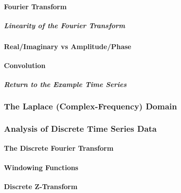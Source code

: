 \documentclass[american, twoside]{article}
\begin{document}
\paragraph{Fourier Transform} \label{Background:Math:Spectral:FourTransform}
\subparagraph{Linearity of the Fourier Transform} \label{Background:Math:Spectral:FourTransform:Linearity}
\paragraph{Real/Imaginary vs Amplitude/Phase} \label{Background:Math:Spectral:AmplitudePhase}
\paragraph{Convolution} \label{Background:Math:Spectral:Convolution}
\subparagraph{Return to the Example Time Series} \label{Background:Math:Spectral:Example}
\subsubsection{The Laplace (Complex-Frequency) Domain} \label{Background:Math:Laplace}
\subsubsection{Analysis of Discrete Time Series Data} \label{Background:Math:Discrete}
\paragraph{The Discrete Fourier Transform} \label{Background:Math:Discrete:FourierTransform}
\paragraph{Windowing Functions} \label{Background:Math:Discrete:Windowing}
\paragraph{Discrete Z-Transform} \label{Background:Math:Discrete:ZTransform}

\end{document}
